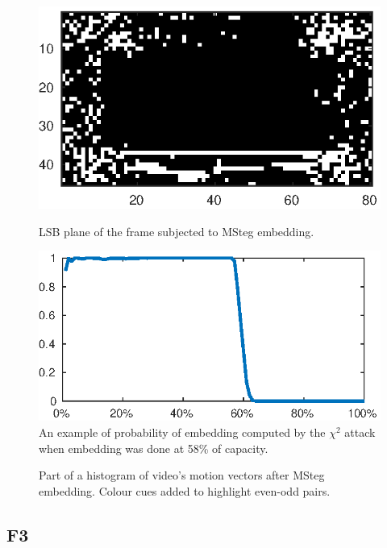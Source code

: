 \documentclass[12pt,british,twoside,notitlepage,usenames,dvipsnames,hypens,final]{report}
\numberwithin{equation}{section}
\numberwithin{figure}{section}
\begin{document}
\begin{figure}[tbh]
\centering
\begin{minipage}[t]{.4\textwidth}
  \centering
  \includegraphics[scale=0.8]{img/msteg-visual.eps}
  \caption{LSB plane of the frame subjected to MSteg embedding.}
  \label{fig:msteg-visual}
\end{minipage}%
\quad\quad
\begin{minipage}[t]{.45\textwidth}
  \centering
  \includegraphics[scale=0.84]{img/chisq-attack.eps}
  \caption{An example of probability of embedding computed by the $\chi^2$ attack when embedding was done at 58\% of capacity.}
  \label{fig:chisq-attack}
\end{minipage}
\end{figure}

\begin{figure}[tbh]
\centering
\resizebox{0.6\textwidth}{!}{}
\caption{Part of a histogram of video's motion vectors  after MSteg embedding. Colour cues added to highlight even-odd pairs.}
\label{fig:msteg-hist}
\end{figure}

\subsection{F3}
\end{document}
